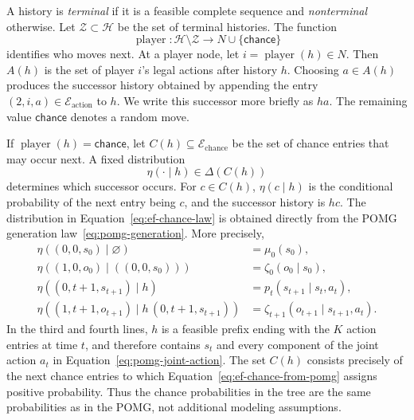 A history is \emph{terminal} if it is a feasible complete sequence and \emph{nonterminal} otherwise. Let $\mathcal{Z}\subset\mathcal{H}$ be the set of terminal histories. The function
\begin{equation}
\label{eq:ef-player-function}
    \operatorname{player}:
    \mathcal{H}\setminus\mathcal{Z}
    \longrightarrow
    N\cup\{\mathsf{chance}\}
\end{equation}
identifies who moves next. At a player node, let $i=\operatorname{player}(h)\in N$. Then $A(h)$ is the set of player $i$'s legal actions after history $h$. Choosing $a\in A(h)$ produces the successor history obtained by appending the entry $(2,i,a)\in\mathcal{E}_{\mathrm{action}}$ to $h$. We write this successor more briefly as $ha$. The remaining value $\mathsf{chance}$ denotes a random move.

If $\operatorname{player}(h)=\mathsf{chance}$, let $C(h)\subseteq\mathcal{E}_{\mathrm{chance}}$ be the set of chance entries that may occur next. A fixed distribution
\begin{equation}
\label{eq:ef-chance-law}
    \eta(\cdot\mid h)\in\Delta(C(h))
\end{equation}
determines which successor occurs. For $c\in C(h)$, $\eta(c\mid h)$ is the conditional probability of the next entry being $c$, and the successor history is $hc$. The distribution in Equation~\eqref{eq:ef-chance-law} is obtained directly from the POMG generation law~\eqref{eq:pomg-generation}. More precisely,
\begin{equation}
\label{eq:ef-chance-from-pomg}
\begin{aligned}
\eta((0,0,s_0)\mid\varnothing)
    &=\mu_0(s_0),\\
\eta((1,0,o_0)\mid((0,0,s_0)))
    &=\zeta_0(o_0\mid s_0),\\
\eta((0,t+1,s_{t+1})\mid h)
    &=p_t(s_{t+1}\mid s_t,a_t),\\
\eta((1,t+1,o_{t+1})\mid h\,(0,t+1,s_{t+1}))
    &=\zeta_{t+1}(o_{t+1}\mid s_{t+1},a_t).
\end{aligned}
\end{equation}
In the third and fourth lines, $h$ is a feasible prefix ending with the $K$ action entries at time $t$, and therefore contains $s_t$ and every component of the joint action $a_t$ in Equation~\eqref{eq:pomg-joint-action}. The set $C(h)$ consists precisely of the next chance entries to which Equation~\eqref{eq:ef-chance-from-pomg} assigns positive probability. Thus the chance probabilities in the tree are the same probabilities as in the POMG, not additional modeling assumptions.

